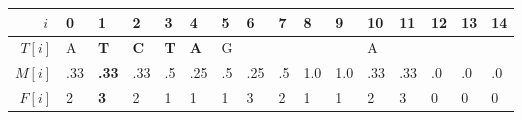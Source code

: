 \documentclass[20pt,border=5pt]{standalone}
\newcommand{\redBit}[1]{\begingroup\color{myclr1}\textbf{#1}\endgroup}
\begin{document}
\LARGE

\def\arraystretch{1.3}
\begin{tabular}{|r|C{10mm}|C{10mm}|C{10mm}|C{10mm}|C{10mm}|C{10mm}|C{10mm}|C{10mm}|C{10mm}|C{10mm}|C{10mm}|C{10mm}|C{10mm}|C{10mm}|C{10mm}|}
\hline
$i\phantom{]}$ & 0 & \redBit{1} & 2 & 3 & 4 & 5 & \redBit{6} & 7 & 8 & 9 & 10 & \redBit{11} & 12 & 13 & 14 \\
\hline
$T[i]$ & A & \redBit{T} & \redBit{C} & \redBit{T} & \redBit{A} & G &  &  &  &  & A &  &  &  &  \\
\hline
$M[i]$ & .33 & \redBit{.33} & .33 & .5 & .25 & .5 & .25 & .5 & 1.0 & 1.0 & .33 & .33 & .0 & .0 & .0 \\
\hline
$F[i]$ & 2 & \redBit{3} & 2 & 1 & 1 & 1 & 3 & 2 & 1 & 1 & 2 & 3 & 0 & 0 & 0 \\
\hline
\end{tabular}
\end{document}
